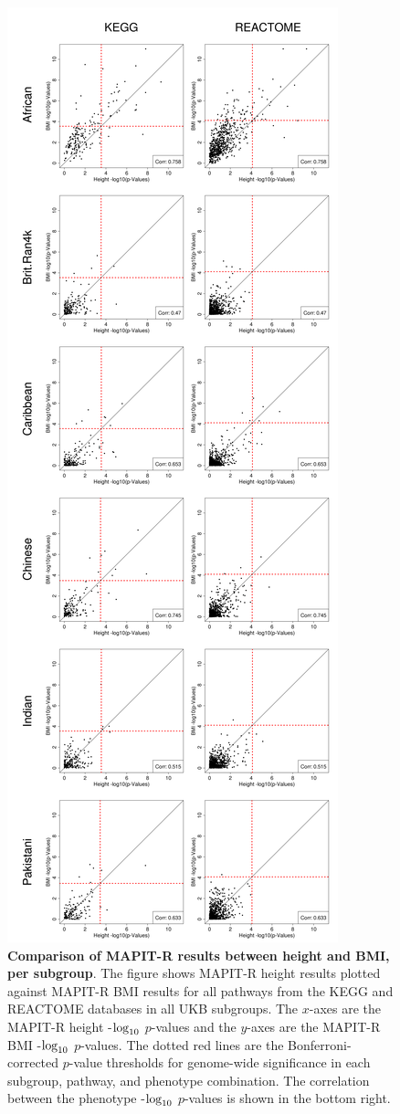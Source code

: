 \documentclass[12pt,a4paper]{article}
\def\log{{\rm log}}
\begin{document}
\setlength{\footskip}{3cm}
\begin{figure}[htbp]
\centering
\vspace*{-2cm}
\includegraphics[scale=.2]{Images/Supp/InterPath_Supp_Figure_MAPITR_PhenoComps_AllPops_vs3.png}
\caption[TBD]{\textbf{Comparison of MAPIT-R results between height and BMI, per subgroup}. The figure shows MAPIT-R height results plotted against MAPIT-R BMI results for all pathways from the KEGG and REACTOME databases in all UKB subgroups. The $x$-axes are the MAPIT-R height -$\log_{10}$ $p$-values and the $y$-axes are the MAPIT-R BMI -$\log_{10}$ $p$-values. The dotted red lines are the Bonferroni-corrected $p$-value thresholds for genome-wide significance in each subgroup, pathway, and phenotype combination. The correlation between the phenotype -$\log_{10}$ $p$-values is shown in the bottom right.}
\label{InterPath-Supp-Figure-MAPITR-PhenoComps-AllPops}
\end{figure}
\end{document}
